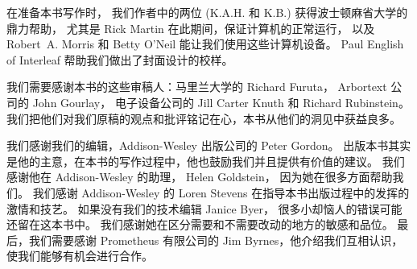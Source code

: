 在准备本书写作时，
我们作者中的两位 (K.A.H. 和 K.B.) 获得波士顿麻省大学的鼎力帮助，
尤其是 Rick Martin 在此期间，保证计算机的正常运行，
以及 Robert~A. Morris 和 Betty O'Neil 能让我们使用这些计算机设备。
Paul English of Interleaf 帮助我们做出了封面设计的校样。

我们需要感谢本书的这些审稿人：马里兰大学的 Richard Furuta，
Arbortext 公司的 John Gourlay，
电子设备公司的 Jill Carter Knuth 和 Richard Rubinstein。
我们把他们对我们原稿的观点和批评铭记在心，本书从他们的洞见中获益良多。

我们感谢我们的编辑，Addison-Wesley 出版公司的 Peter Gordon。
出版本书其实是他的主意，在本书的写作过程中，他也鼓励我们并且提供有价值的建议。
我们感谢他在 Addison-Wesley 的助理， Helen Goldstein， 因为她在很多方面帮助我们。
我们感谢 Addison-Wesley 的 Loren Stevens 在指导本书出版过程中的发挥的激情和技艺。
如果没有我们的技术编辑 Janice Byer， 很多小却恼人的错误可能还留在这本书中。
我们感谢她在区分需要和不需要改动的地方的敏感和品位。
最后，我们需要感谢 Prometheus 有限公司的 Jim Byrnes，他介绍我们互相认识，使我们能够有机会进行合作。
\baselineskip

